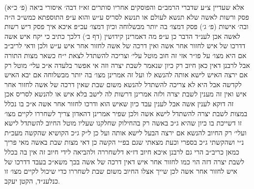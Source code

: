 \documentclass[12pt, openany]{book}
\begin{document}
\begin{multicols}{2}
אלא שעדיין צ״ע שדברי הרמב״ם והפוסקים אחריו סותרים זא״ז דבה׳ איסורי ביאה (פ׳ כ״א) פסק ורשות לאשה שלא תנשא לעולם או תנשא לסריס ע״ש והוא ע״פ התוספתא כמש״כ ה״ה ובה׳ אישות (פ׳ ג׳) פסק דמצו׳ בה יותר מבשלוחה וכיון דמצו׳ עכ״פ איכא איך פסק דיש רשות לאשה אכן לענ״ד הדבר כן ע״פ מה דאמרינן קידושין (דף ב׳) דלכך כתיב כי יקח איש אשה דדרכו של איש לחזור אחר אשה ואין דרכה של אשה לחזור אחר איש ע״ש ולכן ודאי לריב״ב אם היא מצו׳ על פו״ר אזי זה חוב מוטל עלי׳ וצריכה להשתדל לצאת י״ח כשאר מצות התורה אבל לרבנן דאין כאן חיוב רק כיון שנאמר לשבת יצרה וזה אי אפשר בלעדה א״כ עלי׳ מוטל רק אם ירצה האיש לישא אותה להנשא לו ועל זה אמרינן מצו׳ בה יותר מבשלוחה אם יבא האיש לקדשה אבל היא לא צריכה להשתדל להנשא משום שבת שאין דרכה של אשה לחזור אחר איש ואין זה מענין לשבת יצרה ולזה אמרינן דרשות לה לישב בלא איש או להנשא לסריס אכן זה דוקא לענין אשה אבל לענין עבד כיון שאיש הוא ודרכו לחזור אחר אשה א״כ בו נכלל במצות לשבת יצרה להשתדל לישא אשה ולכן שפיר אמרינן דהאדון צריך לשחררו לקיים מצו׳ זו דשייכת בו כיון שהיא ג״כ באשה רק בהחילוק שחלקנו שעליו מוטל החיוב להשתדל לישא ועלי׳ רק החיוב להנשא אם ירצה הבעל לישא אותה ועל כן ל״ק ג״כ הקושיא שהקשה מעכ״ת נ״י ושהקשתי ג״כ בספרי וכעת מצאתי שגם בפ״י הקשה כן דאי מצות שבת באשה מאי פריך כמאן כריב״ב הרי גם לרבנן איכא חיוב דז״א דלשחררה ולהביאה לידי חיוב זה אין בה בכלל לשבת יצרה דזה הוי כמו לחזור אחר איש דאין דרכה של אשה בכך משא״כ בעבד דדרכו של איש לחזור אחר אשה לכן שייך אצלו החיוב משום שבת לשחררו כדי שיכול לקיים מצו׳ זו כנלענ״ד, הקטן יעקב.\\\vspace{0pt}

\end{multicols}\newpage
\end{document}
